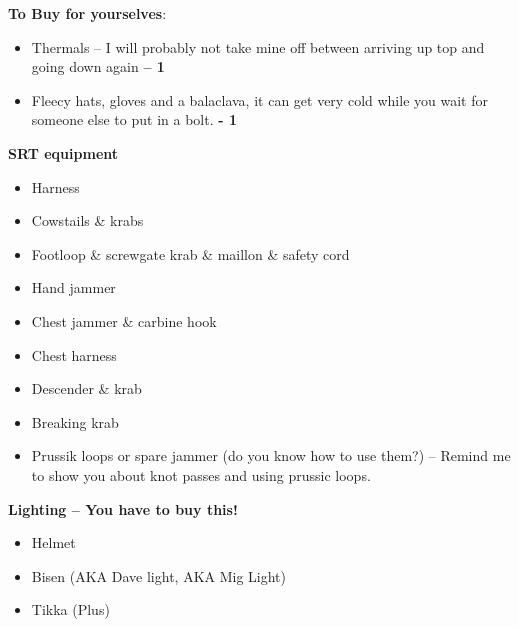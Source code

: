 \textbf{To Buy for yourselves}:
\begin{itemize}
    \item Thermals – I will probably not take mine off between arriving up top and going down again \textbf{– 1}
    \item Fleecy hats, gloves and a balaclava, it can get very cold while you wait for someone else to put in a bolt. \textbf{- 1}
\end{itemize}

\textbf{SRT equipment}
\begin{itemize}
    \item Harness
    \item Cowstails \& krabs
    \item Footloop \& screwgate krab \& maillon \& safety cord
    \item Hand jammer
    \item Chest jammer \& carbine hook
    \item Chest harness
    \item Descender \& krab
    \item Breaking krab
    \item Prussik loops or spare jammer (do you know how to use them?) – Remind me to show you about knot passes and using prussic loops.
\end{itemize}
					
\textbf{Lighting – You have to buy this!}
\begin{itemize}
    \item Helmet
    \item Bisen (AKA Dave light, AKA Mig Light)
    \item Tikka (Plus)
\end{itemize}


